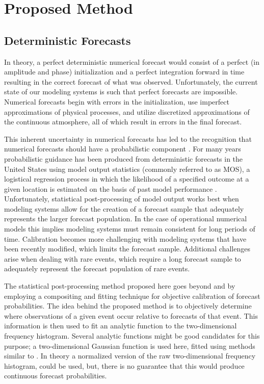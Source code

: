 

\chapter{Proposed Method}
\label{method}


\section{Deterministic Forecasts}
\label{dmethod}

In theory, a perfect deterministic numerical forecast would consist of a perfect (in amplitude and phase) initialization and a perfect integration forward in time resulting in the correct forecast of what was observed. Unfortunately, the current state of our modeling systems is such that perfect forecasts are impossible. Numerical forecasts begin with errors in the initialization, use imperfect approximations of physical processes, and utilize discretized approximations of the continuous atmosphere, all of which result in errors in the final forecast.

This inherent uncertainty in numerical forecasts has led to the recognition that numerical forecasts should have a probabilistic component \citep{ADD}. For many years probabilistic guidance has been produced from deterministic forecasts in the United States using model output statistics (commonly referred to as MOS), a logistical regression process in which the likelihood of a specified outcome at a given location is estimated on the basis of past model performance \citep{Glahn1972}. Unfortunately, statistical post-processing of model output works best when modeling systems allow for the creation of a forecast sample that adequately represents the larger forecast population. In the case of operational numerical models this implies modeling systems must remain consistent for long periods of time. Calibration becomes more challenging with modeling systems that have been recently modified, which limits the forecast sample. Additional challenges arise when dealing with rare events, which require a long forecast sample to adequately represent the forecast population of rare events.

The statistical post-processing method proposed here goes beyond \cite{Theis2005} and \cite{Sobash2011} by employing a compositing and fitting technique for objective calibration of forecast probabilities. The idea behind the proposed method is to objectively determine where observations of a given event occur relative to forecasts of that event. This information is then used to fit an analytic function to the two-dimensional frequency histogram. Several analytic functions might be good candidates for this purpose; a two-dimensional Gaussian function is used here, fitted using methods similar to \cite{Lak2010}. In theory a normalized version of the raw two-dimensional frequency histogram, could be used, but, there is no guarantee that this would produce continuous forecast probabilities.




